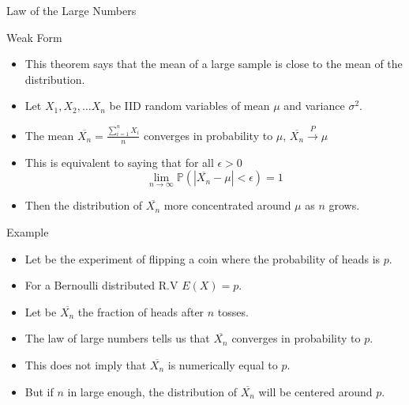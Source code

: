 \documentclass[handout]{beamer}
\begin{document}
\begin{frame}{Law of the Large Numbers}
\scriptsize{
\begin{block}{Weak Form}
\begin{itemize}
\item This theorem says that the mean of a large sample is close to the mean of the distribution.
 \item Let $X_{1},X_{2},\dots X_{n}$ be IID random variables of mean $\mu$ and variance $\sigma^2$.
 \item The mean $\overline{X_{n}} =\frac{\sum_{i=1}^{n}X_{i}}{n}$ converges in probability to $\mu$, $\overline{X_{n}} \overset{P}{\rightarrow} \mu$   
 \item This is equivalent to saying that for all $\epsilon > 0$
 \begin{displaymath}
  \lim_{n\rightarrow \infty} \mathbb{P}(|\overline{X_{n}} - \mu| < \epsilon)=1
 \end{displaymath}
\item Then the distribution of  $\overline{X_{n}}$ more
concentrated around $\mu$ as $n$ grows.
\end{itemize}
\end{block}
\begin{block}{Example}
\begin{itemize}
 \item Let be the experiment of flipping a coin where the probability of heads is $p$.
 \item For a Bernoulli distributed R.V $E(X)=p$.
 \item Let be $\overline{X_{n}}$ the fraction of heads after $n$ tosses.
 \item The law of large numbers tells us that  $\overline{X_{n}}$ converges in probability to $p$.
 \item This does not imply that  $\overline{X_{n}}$ is numerically equal to $p$.
 \item  But if $n$ in large enough, the distribution of $\overline{X_{n}}$ will be centered around $p$.
\end{itemize}

 
\end{block}



}
 
\end{frame}
\end{document}
